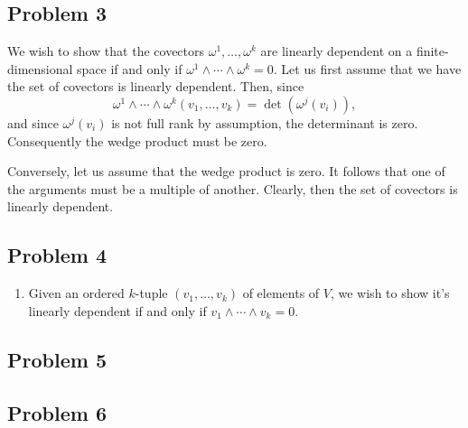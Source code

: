 \documentclass{../../mathnotes}
\begin{document}
\subsection*{Problem 3}

We wish to show that the covectors $\omega^1,\ldots,\omega^k$ are linearly dependent on a finite-dimensional space
if and only if $\omega^1\wedge\cdots\wedge\omega^k=0$. Let us first assume that we have the set of covectors is linearly
dependent. Then, since
\[\omega^1\wedge\cdots\wedge\omega^k(v_1,\ldots,v_k)=\det(\omega^j(v_i)),\]
and since $\omega^j(v_i)$ is not full rank by assumption, the determinant is zero. Consequently the wedge product must
be zero.

Conversely, let us assume that the wedge product is zero. It follows that one of the arguments must be a multiple of another.
Clearly, then the set of covectors is linearly dependent.

\subsection*{Problem 4}

\begin{enumerate}
    \item 
        Given an ordered $k$-tuple $(v_1,\ldots,v_k)$ of elements of $V$, we wish to show it's linearly dependent if and
        only if $v_1\wedge\cdots\wedge v_k=0$.
\end{enumerate}

\subsection*{Problem 5}
\subsection*{Problem 6}
\end{document}
